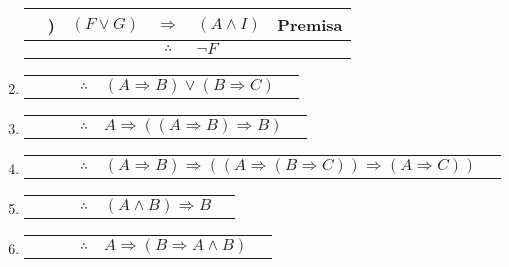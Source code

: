 \documentclass[12pt]{report}
\theoremstyle{largebreak}
\newcommand{\pstable}[1]{\arabic{#1})\stepcounter{#1}}
\newcounter{tablec}
\begin{document}
\begin{sol}
\begin{enumerate}
\begin{center}
\begin{tabular}{l r l c l r}
                    & \pstable{tablec} & $(F\lor G)$ & $\Rightarrow$ & $(A\land I)$ & Premisa \\
                    \hline
                    & & & $\therefore$ & $\neg F$ & \\
                \end{tabular}
            \end{center}
            \item
            \begin{center}
                \setcounter{tablec}{1}
                \begin{tabular}{l r l c l r}
                    \hline
                    & & & $\therefore$ & $(A\Rightarrow B)\lor (B\Rightarrow C)$ & \\
                \end{tabular}
            \end{center}
            \item
            \begin{center}
                \setcounter{tablec}{1}
                \begin{tabular}{l r l c l r}
                    \hline
                    & & & $\therefore$ & $A\Rightarrow ((A\Rightarrow B)\Rightarrow B)$ & \\
                \end{tabular}
            \end{center}
            \item
            \begin{center}
                \begin{tabular}{l r l c l r}
                    \hline
                    & & & $\therefore$ & $(A\Rightarrow B)\Rightarrow((A\Rightarrow (B\Rightarrow C))\Rightarrow(A\Rightarrow C))$ & \\
                \end{tabular}
            \end{center}
            \item
            \begin{center}
                \setcounter{tablec}{1}
                \begin{tabular}{l r l c l r}
                    \hline
                    & & & $\therefore$ & $(A\land B)\Rightarrow B$ & \\
                \end{tabular}
            \end{center}
            \item
            \begin{center}
                \setcounter{tablec}{1}
                \begin{tabular}{l r l c l r}
                    \hline
                    & & & $\therefore$ & $A\Rightarrow(B\Rightarrow A\land B)$ & \\
                \end{tabular}
            \end{center}
        \end{enumerate}
    \end{sol}
\end{document}
